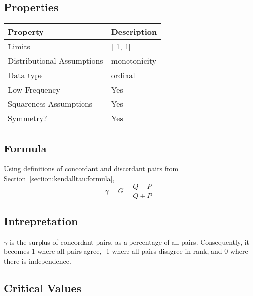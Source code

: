 \documentclass[11pt]{article}
\begin{document}
\subsection{Properties}
\begin{tabular}{| l || l |}
    \hline
    {\bf Property} & {\bf Description} \\
    \hline
    Limits & [-1, 1] \\ \hline

    Distributional Assumptions& monotonicity \\ \hline

    Data type & ordinal \\ \hline

    Low Frequency & Yes \\ \hline

    Squareness Assumptions & Yes \\ \hline
    
    Symmetry? & Yes \\ \hline

\end{tabular}


\subsection{Formula}
Using definitions of concordant and discordant pairs from Section~\ref{section:kendalltau:formula},
$$
\gamma = G = \frac{Q-P}{Q+P}
$$

\subsection{Intrepretation}
$\gamma$ is the surplus of concordant pairs, as a percentage of all pairs.  Consequently, it becomes 1 where all pairs agree, -1 where all pairs disagree in rank, and 0 where there is independence.

\subsection{Critical Values}
\end{document}
